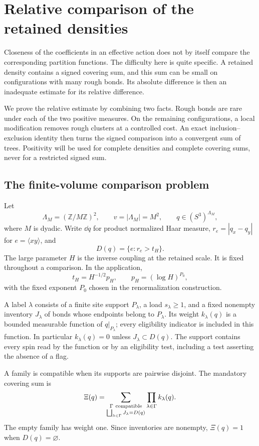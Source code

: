 \section{Relative comparison of the retained densities}
\label{cmp:section}

Closeness of the coefficients in an effective action does not by itself
compare the corresponding partition functions.  The difficulty here is
quite specific.  A retained density contains a signed covering sum, and
this sum can be small on configurations with many rough bonds.  Its
absolute difference is then an inadequate estimate for its relative
difference.

We prove the relative estimate by combining two facts.  Rough bonds are
rare under each of the two positive measures.  On the remaining
configurations, a local modification removes rough clusters at a
controlled cost.  An exact inclusion--exclusion identity then turns the
signed comparison into a convergent sum of trees.  Positivity will be
used for complete densities and complete covering sums, never for a
restricted signed sum.

\subsection{The finite-volume comparison problem}

Let
\[
 \Lambda_M=(\mathbb Z/M\mathbb Z)^2,\qquad v=|\Lambda_M|=M^2,
 \qquad q\in(S^3)^{\Lambda_M},
\]
where \(M\) is dyadic.  Write \(\dd q\) for product normalized Haar
measure, \(r_e=|q_x-q_y|\) for \(e=\langle xy\rangle\), and
\[
 D(q)=\{e:r_e>t_H\}.
\]
The large parameter \(H\) is the inverse coupling at the retained scale.
It is fixed throughout a comparison.  In the application,
\[
 t_H=H^{-1/2}p_H,\qquad p_H=(\log H)^{P_0},
\]
with the fixed exponent \(P_0\) chosen in the renormalization construction.

\begin{definition}
\label{cmp:cover-definition}
A label \(\lambda\) consists of a finite site support \(P_\lambda\), a
load \(s_\lambda\ge1\), and a fixed nonempty inventory \(J_\lambda\) of
bonds whose endpoints belong to \(P_\lambda\).  Its weight
\(k_\lambda(q)\) is a bounded measurable function of \(q|_{P_\lambda}\);
every eligibility indicator is included in this function.  In
particular \(k_\lambda(q)=0\) unless \(J_\lambda\subset D(q)\).
The support contains every spin read by the function or by an
eligibility test, including a test asserting the absence of a flag.

A family is compatible when its supports are pairwise disjoint.  The
mandatory covering sum is
\begin{equation}
 \Xi(q)=
 \sum_{\substack{\Gamma\ {\rm compatible}\\
          \bigsqcup_{\lambda\in\Gamma}J_\lambda=D(q)}}
            \prod_{\lambda\in\Gamma}k_\lambda(q).
 \label{cmp:cover}
\end{equation}
The empty family has weight one.  Since inventories are nonempty,
\(\Xi(q)=1\) when \(D(q)=\varnothing\).
\end{definition}


